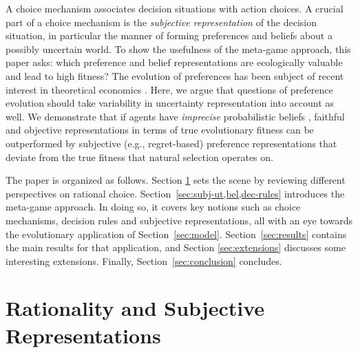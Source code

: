 \documentclass[fleqn,reqno,12pt]{article}
\theoremstyle{Satz}
\theoremstyle{Bsp}
\begin{document}
A choice mechanism associates decision situations with action choices. A crucial part of a
choice mechanism is the \emph{subjective representation} of the decision situation, in
particular the manner of forming preferences and beliefs about a possibly uncertain world. To
show the usefulness of the meta-game approach, this paper asks: which preference and belief
representations are ecologically valuable and lead to high fitness? The evolution of
preferences has been subject of recent interest in theoretical economics
\citep[e.g.,][]{algweib13,DekElyYlan07,RobSam11}. Here, we argue that questions of preference
evolution should take variability in uncertainty representation into account as well. We
demonstrate that if agents have \emph{imprecise} probabilistic beliefs
\citep[e.g.,][]{gardsah82,levi74,walley96}, faithful and objective representations in terms of
true evolutionary fitness can be outperformed by subjective (e.g., regret-based)
preference representations that deviate from the true fitness that natural selection operates
on.


The paper is organized as follows. Section \ref{sec:rati--subj} sets the scene by reviewing
different perspectives on rational choice. Section~\ref{sec:subj-ut,bel,dec-rules} introduces
the meta-game approach. In doing so, it covers key notions such as choice mechanisms, decision
rules and subjective representations, all with an eye towards the evolutionary application of
Section~\ref{sec:model}. Section~\ref{sec:results} contains the main results for that
application, and Section \ref{sec:extensions} discusses some interesting extensions. Finally,
Section~\ref{sec:conclusion} concludes.

\section{Rationality and Subjective Representations}
\label{sec:rati--subj}
\end{document}
